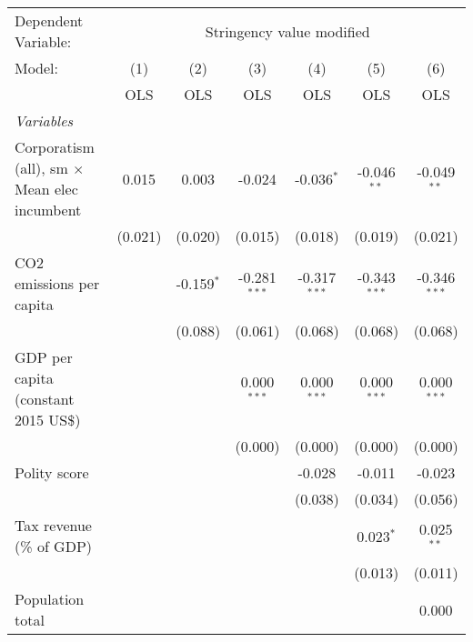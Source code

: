 
\begingroup
\centering
\begin{tabular}{lcccccc}
   \toprule
   Dependent Variable: & \multicolumn{6}{c}{Stringency value modified}\\
   Model:                                              & (1)     & (2)          & (3)            & (4)            & (5)            & (6)\\  
                                                       &  OLS    & OLS          & OLS            & OLS            & OLS            & OLS\\  
   \midrule
   \emph{Variables}\\
   Corporatism (all), sm $\times$ Mean elec incumbent  & 0.015   & 0.003        & -0.024         & -0.036$^{*}$   & -0.046$^{**}$  & -0.049$^{**}$\\   
                                                       & (0.021) & (0.020)      & (0.015)        & (0.018)        & (0.019)        & (0.021)\\   
   CO2 emissions per capita                            &         & -0.159$^{*}$ & -0.281$^{***}$ & -0.317$^{***}$ & -0.343$^{***}$ & -0.346$^{***}$\\   
                                                       &         & (0.088)      & (0.061)        & (0.068)        & (0.068)        & (0.068)\\   
   GDP per capita (constant 2015 US\$)                 &         &              & 0.000$^{***}$  & 0.000$^{***}$  & 0.000$^{***}$  & 0.000$^{***}$\\   
                                                       &         &              & (0.000)        & (0.000)        & (0.000)        & (0.000)\\   
   Polity score                                        &         &              &                & -0.028         & -0.011         & -0.023\\   
                                                       &         &              &                & (0.038)        & (0.034)        & (0.056)\\   
   Tax revenue (\% of GDP)                             &         &              &                &                & 0.023$^{*}$    & 0.025$^{**}$\\   
                                                       &         &              &                &                & (0.013)        & (0.011)\\   
   Population total                                    &         &              &                &                &                & 0.000\\   

\end{tabular}
